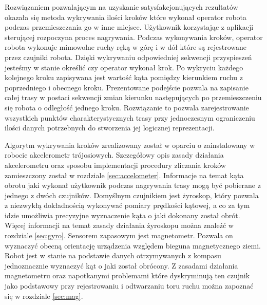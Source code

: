Rozwiązaniem pozwalającym na uzyskanie satysfakcjonujących rezultatów okazała
się metoda wykrywania ilości kroków które wykonał operator robota podczas 
przemieszczania go w inne miejsce. Użytkownik korzystając z aplikacji
sterującej rozpoczyna proces nagrywania. Podczas wykonywania kroków, operator 
robota wykonuje mimowolne ruchy ręką w górę i w dół które są rejestrowane przez
czujniki robota. Dzięki wykrywaniu odpowiedniej sekwencji przyspieszeń jesteśmy
w stanie określić czy operator wykonał krok. Po wykryciu każdego kolejnego kroku
zapisywana jest wartość kąta pomiędzy kierunkiem ruchu z poprzedniego i obecnego
kroku. Prezentowane podejście pozwala na zapisanie całej trasy w postaci
sekwencji zmian kierunku następujących po przemieszczeniu się robota o odległość
jednego kroku. Rozwiązanie to pozwala zarejestrowanie wszystkich punktów
charakterystycznych trasy przy jednoczesnym ograniczeniu ilości danych
potrzebnych do stworzenia jej logicznej reprezentacji.

Algorytm wykrywania kroków zrealizowany został w oparciu o zainstalowany w
robocie akcelerometr trójosiowych. Szczegółowy opis zasady działania
akcelerometru oraz sposobu implementacji procedury zliczania kroków zamieszczony
został w rozdziale \ref{sec:accelometer}. Informacje na temat kąta obrotu jaki
wykonał użytkownik podczas nagrywania trasy mogą być pobierane z jednego z dwóch
czujników. Domyślnym czujnikiem jest żyroskop, który pozwala z niezwykłą
dokładnością wykonywać pomiary prędkości kątowej, a co za tym idzie umożliwia
precyzyjne wyznaczenie kąta o jaki dokonany został obrót. Więcej informacji na
temat zasady działania żyroskopu można znaleźć w rozdziale \ref{sec:gyro}.
Sensorem zapasowym jest magnetometr. Pozwala on wyznaczyć obecną orientację 
urządzenia względem bieguna magnetycznego ziemi. Robot jest w stanie na 
podstawie danych otrzymywanych z kompasu jednoznacznie wyznaczyć kąt o jaki 
został obrócony. Z zasadami działania magnetometru oraz
napotkanymi problemami które dyskryminują ten czujnik jako podstawowy przy
rejestrowaniu i odtwarzaniu toru ruchu można zapoznać się w rozdziale
\ref{sec:mag}.

